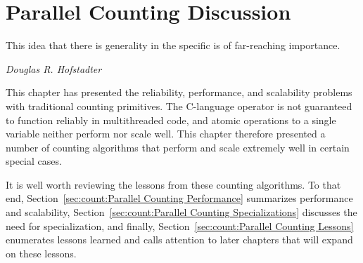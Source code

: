 \section{Parallel Counting Discussion}
\label{sec:count:Parallel Counting Discussion}
%
\epigraph{This idea that there is generality in the specific is of
	  far-reaching importance.}
	 {\emph{Douglas R. Hofstadter}}

This chapter has presented the reliability, performance, and
scalability problems with traditional counting primitives.
The C-language \co{++} operator is not guaranteed to function reliably in
multithreaded code, and atomic operations to a single variable neither
perform nor scale well.
This chapter therefore presented a number of counting algorithms that
perform and scale extremely well in certain special cases.

It is well worth reviewing the lessons from these counting algorithms.
To that end,
Section~\ref{sec:count:Parallel Counting Performance}
summarizes performance and scalability,
Section~\ref{sec:count:Parallel Counting Specializations}
discusses the need for specialization,
and finally,
Section~\ref{sec:count:Parallel Counting Lessons}
enumerates lessons learned and calls attention to later chapters that
will expand on these lessons.

